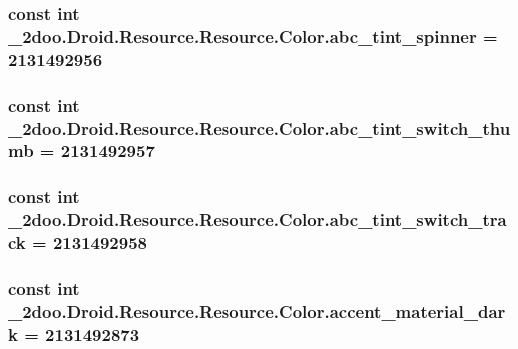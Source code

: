 \hypertarget{class__2doo_1_1_droid_1_1_resource_1_1_color_b7a4b52a736c42ef9d9f490b55227085}{
\subsubsection[{abc\_\-tint\_\-spinner}]{\setlength{\rightskip}{0pt plus 5cm}const int \_\-2doo.Droid.Resource.Resource.Color.abc\_\-tint\_\-spinner = 2131492956}}
\label{class__2doo_1_1_droid_1_1_resource_1_1_color_b7a4b52a736c42ef9d9f490b55227085}


\hypertarget{class__2doo_1_1_droid_1_1_resource_1_1_color_8a2f92e0fd030b8367c7b1f211cf0801}{
\subsubsection[{abc\_\-tint\_\-switch\_\-thumb}]{\setlength{\rightskip}{0pt plus 5cm}const int \_\-2doo.Droid.Resource.Resource.Color.abc\_\-tint\_\-switch\_\-thumb = 2131492957}}
\label{class__2doo_1_1_droid_1_1_resource_1_1_color_8a2f92e0fd030b8367c7b1f211cf0801}


\hypertarget{class__2doo_1_1_droid_1_1_resource_1_1_color_48fdb762ba1c303fd0cb996b92149e7b}{
\subsubsection[{abc\_\-tint\_\-switch\_\-track}]{\setlength{\rightskip}{0pt plus 5cm}const int \_\-2doo.Droid.Resource.Resource.Color.abc\_\-tint\_\-switch\_\-track = 2131492958}}
\label{class__2doo_1_1_droid_1_1_resource_1_1_color_48fdb762ba1c303fd0cb996b92149e7b}


\hypertarget{class__2doo_1_1_droid_1_1_resource_1_1_color_e89b9c8481354f8d63aec781f1f25d43}{
\subsubsection[{accent\_\-material\_\-dark}]{\setlength{\rightskip}{0pt plus 5cm}const int \_\-2doo.Droid.Resource.Resource.Color.accent\_\-material\_\-dark = 2131492873}}
\label{class__2doo_1_1_droid_1_1_resource_1_1_color_e89b9c8481354f8d63aec781f1f25d43}


